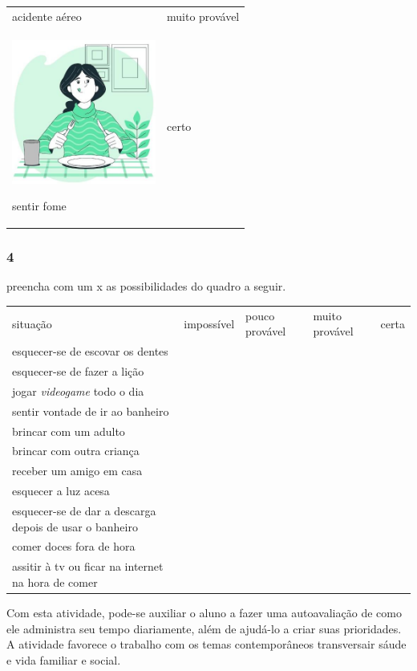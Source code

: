 \begin{longtable}[]{@{}ll@{}}
\begin{minipage}[t]{0.48\columnwidth}
acidente aéreo\strut
\end{minipage} & \begin{minipage}[t]{0.48\columnwidth}\raggedright\strut
muito provável\strut
\end{minipage}\tabularnewline
\begin{minipage}[t]{0.48\columnwidth}\raggedright\strut
\includegraphics[width=1.86458in,height=1.86458in]{media/image85.jpg}

sentir fome\strut
\end{minipage} & \begin{minipage}[t]{0.48\columnwidth}\raggedright\strut
certo\strut
\end{minipage}\tabularnewline
\bottomrule
\end{longtable}

\subsubsection{4}\label{section-66}

preencha com um x as possibilidades do quadro a seguir.

\begin{longtable}[]{@{}lllll@{}}
\toprule
situação & impossível & pouco provável & muito provável &
certa\tabularnewline
esquecer-se de escovar os dentes & & & &\tabularnewline
esquecer-se de fazer a lição & & & &\tabularnewline
jogar \textit{videogame} todo o dia & & & &\tabularnewline
sentir vontade de ir ao banheiro & & & &\tabularnewline
brincar com um adulto & & & &\tabularnewline
brincar com outra criança & & & &\tabularnewline
receber um amigo em casa & & & &\tabularnewline
esquecer a luz acesa & & & &\tabularnewline
esquecer-se de dar a descarga depois de usar o banheiro & & &
&\tabularnewline
comer doces fora de hora & & & &\tabularnewline
assitir à tv ou ficar na internet na hora de comer & & & &\tabularnewline
\bottomrule
\end{longtable}

Com esta atividade, pode-se auxiliar o aluno a fazer uma autoavaliação de como ele administra seu tempo diariamente, além de ajudá-lo
a criar suas prioridades. A atividade favorece o trabalho com os temas contemporâneos transversair sáude e vida familiar e social.

